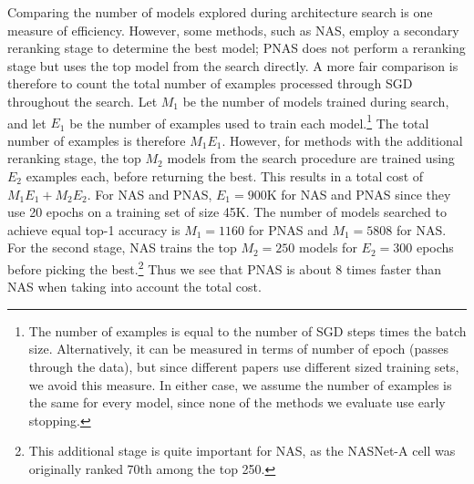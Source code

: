\documentclass[runningheads]{llncs}
\begin{document}
Comparing the number of models explored during architecture search is one measure of efficiency.
However, some methods, such as NAS, employ a secondary reranking stage to determine the best model; PNAS does not perform a reranking stage but uses the top model from the search directly. 
A more fair comparison is therefore to count the total number of examples processed through SGD throughout the search.
Let $M_1$ be the number of models trained during search,
and let $E_1$ be the number of examples used to train each model.\footnote{The number of examples is equal to the number of SGD steps
times the batch size.
Alternatively, it can be measured in terms of number of epoch (passes through the data),
but since different papers use different sized training sets, we avoid this measure.
In either case, we assume the number of examples is the same for every model, since none of the methods
we evaluate use early stopping.
}%
The total number of examples is therefore $M_1 E_1$.
However, for methods with the additional reranking stage,
the top $M_2$ models from the search procedure are trained using $E_2$ examples each, before returning the best.
This results in a total cost of 
$M_1 E_1 + M_2 E_2$.
For NAS and PNAS, 
 $E_1=900$K for NAS and PNAS since they use 20 epochs on a training set of size 45K.
The number of models searched to achieve equal top-1 accuracy is
$M_1=1160$ for PNAS and $M_1=5808$ for NAS.
For the second stage, NAS trains the top $M_2=250$ models for 
$E_2=300$ epochs before picking the best.\footnote{This additional stage is quite important for NAS, as the NASNet-A cell was originally ranked 70th among the top 250.
}
Thus we see  that PNAS is about 8 times faster than NAS when taking into account the total cost.
\end{document}
